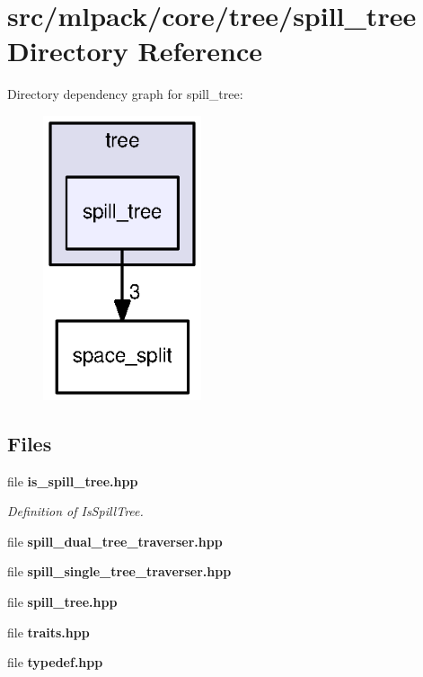\section{src/mlpack/core/tree/spill\+\_\+tree Directory Reference}
\label{dir_337db9a6a47b9eca6587909f40224d7c}
Directory dependency graph for spill\+\_\+tree\+:
\nopagebreak
\begin{figure}[H]
\begin{center}
\leavevmode
\includegraphics[width=132pt]{dir_337db9a6a47b9eca6587909f40224d7c_dep}
\end{center}
\end{figure}
\subsection*{Files}
\begin{DoxyCompactItemize}
\item 
file {\bf is\+\_\+spill\+\_\+tree.\+hpp}
\begin{DoxyCompactList}\small\item\em Definition of Is\+Spill\+Tree. \end{DoxyCompactList}\item 
file {\bf spill\+\_\+dual\+\_\+tree\+\_\+traverser.\+hpp}
\item 
file {\bf spill\+\_\+single\+\_\+tree\+\_\+traverser.\+hpp}
\item 
file {\bf spill\+\_\+tree.\+hpp}
\item 
file {\bf traits.\+hpp}
\item 
file {\bf typedef.\+hpp}
\end{DoxyCompactItemize}
